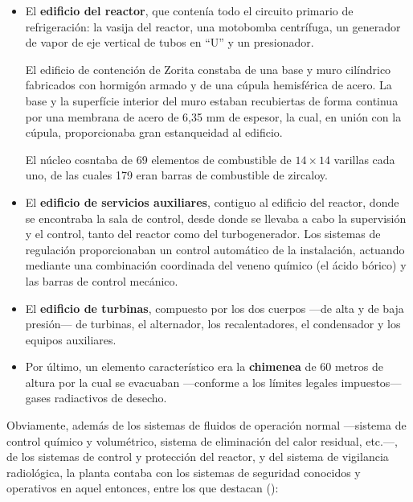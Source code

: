 \begin{itemize}
  \item El \textbf{edificio del reactor}, que contenía todo el circuito primario de refrigeración: la vasija del reactor, una motobomba centrífuga, un generador de vapor de eje vertical de tubos en ``U'' y un presionador.
  
  El edificio de contención de Zorita constaba de una base y muro cilíndrico fabricados con hormigón armado y de una cúpula hemisférica de acero. La base y la superfície interior del muro estaban recubiertas de forma continua por una membrana de acero de 6,35 mm de espesor, la cual, en unión con la cúpula, proporcionaba gran estanqueidad al edificio. 

  El núcleo cosntaba de 69 elementos de combustible de $14 \times 14$ varillas cada uno, de las cuales 179 eran barras de combustible de zircaloy.

  \item El \textbf{edificio de servicios auxiliares}, contiguo al edificio del reactor, donde se encontraba la sala de control, desde donde se llevaba a cabo la supervisión y el control, tanto del reactor como del turbogenerador. Los sistemas de regulación proporcionaban un control automático de la instalación, actuando mediante una combinación coordinada del veneno químico (el ácido bórico) y las barras de control mecánico.

  \item El \textbf{edificio de turbinas}, compuesto por los dos cuerpos ---de alta y de baja presión--- de turbinas,  el alternador, los recalentadores, el condensador y los equipos auxiliares.
  
  \item Por último, un elemento característico era la \textbf{chimenea} de 60 metros de altura por la cual se evacuaban ---conforme a los límites legales impuestos--- gases radiactivos de desecho.
\end{itemize}

Obviamente, además de los sistemas de fluidos de operación normal ---sistema de control químico y volumétrico, sistema de eliminación del calor residual, etc.---, de los sistemas de control y protección del reactor, y del sistema de vigilancia radiológica, la planta contaba con los sistemas de seguridad conocidos y operativos en aquel entonces, entre los que destacan (\cite{documentacion_sgiz}):

